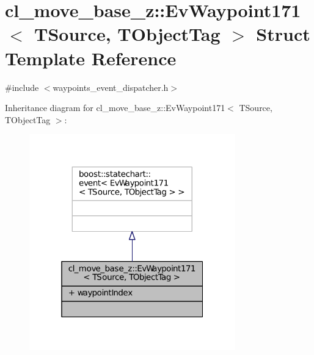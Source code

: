 \hypertarget{structcl__move__base__z_1_1EvWaypoint171}{}\section{cl\+\_\+move\+\_\+base\+\_\+z\+:\+:Ev\+Waypoint171$<$ T\+Source, T\+Object\+Tag $>$ Struct Template Reference}
\label{structcl__move__base__z_1_1EvWaypoint171}


{\ttfamily \#include $<$waypoints\+\_\+event\+\_\+dispatcher.\+h$>$}



Inheritance diagram for cl\+\_\+move\+\_\+base\+\_\+z\+:\+:Ev\+Waypoint171$<$ T\+Source, T\+Object\+Tag $>$\+:
\nopagebreak
\begin{figure}[H]
\begin{center}
\leavevmode
\includegraphics[width=253pt]{structcl__move__base__z_1_1EvWaypoint171__inherit__graph}
\end{center}
\end{figure}


